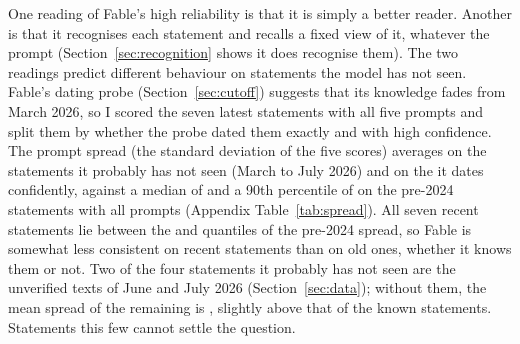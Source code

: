 One reading of Fable's high reliability is that it is simply a better reader. Another is that it
recognises each statement and recalls a fixed view of it, whatever the prompt
(Section~\ref{sec:recognition} shows it does recognise them). The two readings predict different
behaviour on statements the model has not seen. Fable's dating probe (Section~\ref{sec:cutoff}) suggests
that its knowledge fades from March 2026, so I scored the seven latest statements with all five prompts
and split them by whether the probe dated them exactly and with high confidence. The prompt spread (the standard deviation of the five scores) averages 
on the  statements it probably has not seen (March to July 2026) and 
on the  it dates confidently, against a median of  and a 90th
percentile of  on the  pre-2024 statements with all prompts (Appendix
Table~\ref{tab:spread}). All seven recent statements lie between the  and
 quantiles of the pre-2024 spread, so Fable is somewhat less consistent on recent
statements than on old ones, whether it knows them or not. Two of the four statements it probably has
not seen are the unverified texts of June and July 2026 (Section~\ref{sec:data}); without them, the mean
spread of the remaining  is , slightly above that
of the known statements. Statements this few cannot settle the question.
